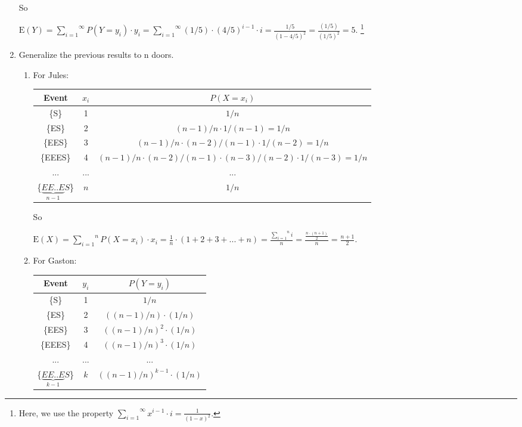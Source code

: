 \documentclass[12pt,thmsa]{article}
\begin{document}
\begin{enumerate}
So
\begin{center}
$\mbox{E}(Y) = \overset{\infty}{\underset{i=1}{\sum}}P(Y=y_i)\cdot y_i = \overset{\infty}{\underset{i=1}{\sum}}(1/5)\cdot(4/5)^{i-1}\cdot i=\frac{1/5}{(1-4/5)^2}=\frac{(1/5)}{(1/5)^2}=5. $\hspace{0.05cm} \footnote{Here, we use the property $\overset{\infty}{\underset{i=1}{\sum}}x^{i-1}\cdot i=\frac{1}{(1-x)^2}$.}
\end{center}

\item Generalize the previous results to n doors.
\begin{enumerate}%
\item For Jules:

\begin{center}
\begin{tabular}{|c|c|c|}
\hline
Event & $x_i$ & $P(X=x_i)$ \\[1mm]
\hline
\{S\} & 1 & $1/n$\\[1mm]
\hline
\{ES\} & 2 & $(n-1)/n\cdot 1/(n-1)=1/n$\\[1mm]
\hline
\{EES\} & 3 & $(n-1)/n\cdot (n-2)/(n-1)\cdot 1/(n-2)=1/n$\\[1mm]
\hline
\{EEES\} & 4 & $(n-1)/n\cdot (n-2)/(n-1)\cdot (n-3)/(n-2)\cdot1/(n-3)=1/n $\\[1mm]
\hline
... & ... & ... \\[1mm]
\hline
\{$\underset{n-1}{\underbrace{EE..E}}S$\} & $n$ & $1/n$\\[1mm]
\hline
\end{tabular}
\end{center}

So
\begin{center}
$\mbox{E}(X) = \overset{n}{\underset{i=1}{\sum}}P(X=x_i)\cdot x_i = \frac{1}{n} \cdot(1+2+3+...+n)=\frac{\overset{n}{\underset{i=1}{\sum}}i}{n}=\frac{\frac{n\cdot(n+1)}{2}}{n}=\frac{n+1}{2}.$
\end{center}

\medskip

\item For Gaston:

\begin{center}
\begin{tabular}{|c|c|c|}
\hline
Event & $y_i$ & $P(Y=y_i)$ \\[1mm]
\hline
\{S\} & 1 & $1/n$\\[1mm]
\hline
\{ES\} & 2 & $((n-1)/n)\cdot (1/n)$\\[1mm]
\hline
\{EES\} & 3 & $((n-1)/n)^2\cdot (1/n)$\\[1mm]
\hline
\{EEES\} & 4 & $((n-1)/n)^3\cdot (1/n) $\\[1mm]
\hline
... & ... & ... \\[1mm]
\hline
\{$\underset{k-1}{\underbrace{EE..E}}S$\} & $k$ & $((n-1)/n)^{k-1}\cdot(1/n)$\\[1mm]
\hline
\end{tabular}
\end{center}


\end{enumerate}
\end{enumerate}
\end{document}
